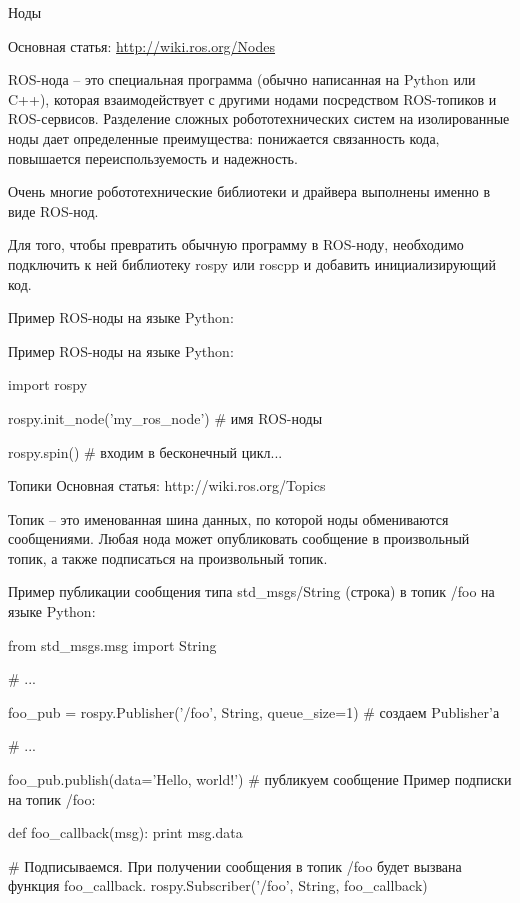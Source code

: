 Ноды

Основная статья: \url{http://wiki.ros.org/Nodes}

ROS-нода – это специальная программа (обычно написанная на Python или C++), которая взаимодействует с другими нодами посредством ROS-топиков и ROS-сервисов. Разделение сложных робототехнических систем на изолированные ноды дает определенные преимущества: понижается связанность кода, повышается переиспользуемость и надежность.

Очень многие робототехнические библиотеки и драйвера выполнены именно в виде ROS-нод.

Для того, чтобы превратить обычную программу в ROS-ноду, необходимо подключить к ней библиотеку rospy или roscpp и добавить инициализирующий код.

Пример ROS-ноды на языке Python:


\begin{Program}[H]
	\caption{Пример ROS-ноды на языке Python:} \label{lst:1}
	\begin{MyCode}
import rospy

rospy.init\_node('my\_ros\_node')  # имя ROS-ноды

rospy.spin()  # входим в бесконечный цикл...
	\end{MyCode}
\end{Program}
Топики
Основная статья: http://wiki.ros.org/Topics

Топик – это именованная шина данных, по которой ноды обмениваются сообщениями. Любая нода может опубликовать сообщение в произвольный топик, а также подписаться на произвольный топик.

\begin{Program}[H]
	\caption{Пример публикации сообщения типа std\_msgs/String (строка) в топик /foo на языке Python:} \label{lst:1}
	\begin{MyCode}
from std\_msgs.msg import String

# ...

foo\_pub = rospy.Publisher('/foo', String, queue\_size=1)  # создаем Publisher'а

# ...

foo\_pub.publish(data='Hello, world!')  # публикуем сообщение
Пример подписки на топик /foo:

def foo\_callback(msg):
print msg.data

# Подписываемся. При получении сообщения в топик /foo будет вызвана функция foo\_callback.
rospy.Subscriber('/foo', String, foo\_callback)
	\end{MyCode}
\end{Program}

